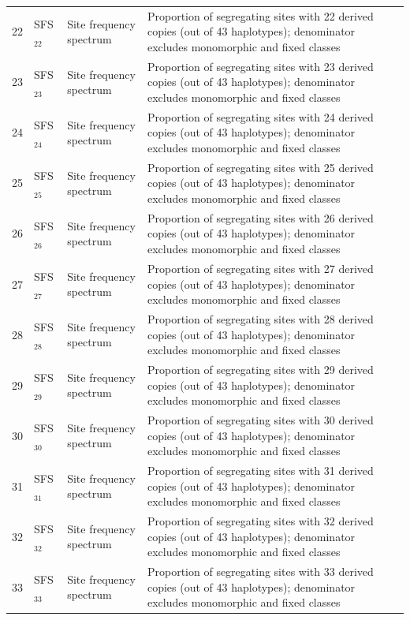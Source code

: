 \begin{longtable}{@{}rllp{7.5cm}@{}}
22 & SFS$_{22}$ & Site frequency spectrum & Proportion of segregating sites with 22 derived copies (out of 43 haplotypes); denominator excludes monomorphic and fixed classes \\
23 & SFS$_{23}$ & Site frequency spectrum & Proportion of segregating sites with 23 derived copies (out of 43 haplotypes); denominator excludes monomorphic and fixed classes \\
24 & SFS$_{24}$ & Site frequency spectrum & Proportion of segregating sites with 24 derived copies (out of 43 haplotypes); denominator excludes monomorphic and fixed classes \\
25 & SFS$_{25}$ & Site frequency spectrum & Proportion of segregating sites with 25 derived copies (out of 43 haplotypes); denominator excludes monomorphic and fixed classes \\
26 & SFS$_{26}$ & Site frequency spectrum & Proportion of segregating sites with 26 derived copies (out of 43 haplotypes); denominator excludes monomorphic and fixed classes \\
27 & SFS$_{27}$ & Site frequency spectrum & Proportion of segregating sites with 27 derived copies (out of 43 haplotypes); denominator excludes monomorphic and fixed classes \\
28 & SFS$_{28}$ & Site frequency spectrum & Proportion of segregating sites with 28 derived copies (out of 43 haplotypes); denominator excludes monomorphic and fixed classes \\
29 & SFS$_{29}$ & Site frequency spectrum & Proportion of segregating sites with 29 derived copies (out of 43 haplotypes); denominator excludes monomorphic and fixed classes \\
30 & SFS$_{30}$ & Site frequency spectrum & Proportion of segregating sites with 30 derived copies (out of 43 haplotypes); denominator excludes monomorphic and fixed classes \\
31 & SFS$_{31}$ & Site frequency spectrum & Proportion of segregating sites with 31 derived copies (out of 43 haplotypes); denominator excludes monomorphic and fixed classes \\
32 & SFS$_{32}$ & Site frequency spectrum & Proportion of segregating sites with 32 derived copies (out of 43 haplotypes); denominator excludes monomorphic and fixed classes \\
33 & SFS$_{33}$ & Site frequency spectrum & Proportion of segregating sites with 33 derived copies (out of 43 haplotypes); denominator excludes monomorphic and fixed classes \\

\end{longtable}
